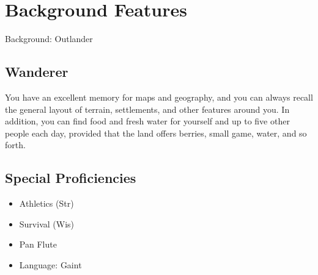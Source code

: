 \documentclass[10pt,twoside,twocolumn,openany]{book}
\begin{document}
\vspace{3cm}
\section{Background Features}
\begin{commentbox}{}
	Background: Outlander 
\end{commentbox}
	\subsection{Wanderer}
		\hypertarget{wanderer}{You have an excellent memory for maps and geography, and you can always recall the general layout of terrain, settlements, and other features around you. In addition, you can find food and fresh water for yourself and up to five other people each day, provided that the land offers berries, small game, water, and so forth.}
	\subsection{Special Proficiencies}
		\begin{itemize}
			\item Athletics (Str)
			\item Survival (Wis)
			\item Pan Flute
			\item Language: Gaint
		\end{itemize}	

		
		
\end{document}
